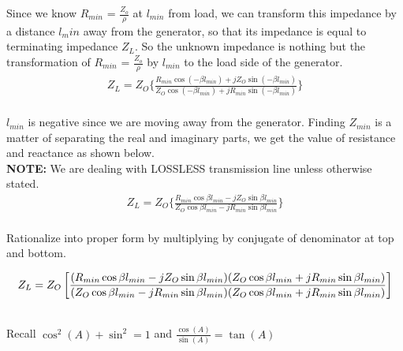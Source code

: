 Since we know $R_{min}$ = $\frac{Z_{o}}{\rho}$ at $l_{min}$ from load, we can transform this impedance by a distance $l_min$ away from the generator, so that its impedance is equal to terminating impedance $Z_{L}$. So the unknown impedance is nothing but the transformation of $R_{min}$ = $\frac{Z_{o}}{\rho}$ by $l_{min}$ to the load side of the generator. 
\begin{align}
Z_{L} = Z_{O}\{\frac{R_{min}\cos(-\beta l_{min}) + jZ_{O}\sin(-\beta l_{min})}{Z_{O}\cos(-\beta l_{min}) + jR_{min}\sin(-\beta l_{min})}\}
\end{align}\\

$l_{min}$ is negative since we are moving away from the generator. Finding $Z_{min}$ is a matter of separating the real and imaginary parts, we get the value of resistance and reactance as shown below. \\\textbf{NOTE:} We are dealing with LOSSLESS transmission line unless otherwise stated.\newline
\begin{align}
Z_{L} = Z_{O}\{\frac{R_{min}\cos\beta l_{min} - jZ_{O}\sin\beta l_{min}}{Z_{O}\cos\beta l_{min} - jR_{min}\sin\beta l_{min}}\}
\end{align}\\ Rationalize into proper form by multiplying by conjugate of denominator at top and bottom.

{\footnotesize \begin{dmath}
Z_{L} =\\ Z_{O}\\ 
\left[\frac{(R_{min}\cos\beta l_{min} - jZ_{O}\sin\beta l_{min})(Z_{O}\cos\beta l_{min} + jR_{min}\sin\beta l_{min})}{(Z_{O}\cos\beta l_{min} - jR_{min}\sin\beta l_{min})(Z_{O}\cos\beta l_{min} + jR_{min}\sin\beta l_{min})}\right]
\end{dmath}} 

\\

Recall $ \cos^{2}(A) + \sin^{2} = 1 $ and $ \frac{\cos(A)}{\sin(A)} = \tan(A) $

